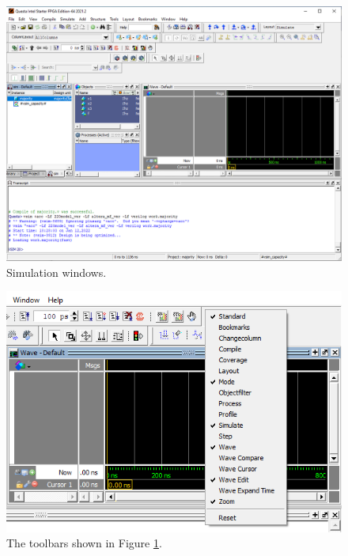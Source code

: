 \documentclass[11pt, twoside, pdftex]{article}
\begin{document}
\begin{figure}[H]
   \begin{center}
      \includegraphics[width=\textwidth]{figures/sim_mode.png}
   \caption{Simulation windows.} 
	 \label{fig:8}
	 \end{center}
\end{figure}

\begin{figure}[H]
   \begin{center}
      \includegraphics[scale=1.50]{figures/toolbar.png}
       \caption{The toolbars shown in Figure \ref{fig:8}.} 
	 \label{fig:toolbars}
	 \end{center}
\end{figure}
\end{document}
